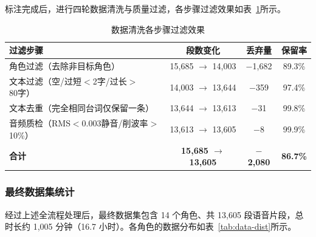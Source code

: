\documentclass[12pt,a4paper]{article}
\begin{document}
标注完成后，进行四轮数据清洗与质量过滤，各步骤过滤效果如表~\ref{tab:data-clean}所示。

\begin{table}[H]
\centering
\caption{数据清洗各步骤过滤效果}
\label{tab:data-clean}
\begin{tabular}{lccc}
\toprule
\textbf{过滤步骤} & \textbf{段数变化} & \textbf{丢弃量} & \textbf{保留率} \\
\midrule
角色过滤（去除非目标角色）         & 15,685 $\to$ 14,003 & $-$1,682 & 89.3\% \\
文本过滤（空/过短$<$2字/过长$>$80字） & 14,003 $\to$ 13,644 & $-$359  & 97.4\% \\
文本去重（完全相同台词仅保留一条）     & 13,644 $\to$ 13,613 & $-$31   & 99.8\% \\
音频质检（RMS$<$0.003静音/削波率$>$10\%） & 13,613 $\to$ 13,605 & $-$8    & 99.9\% \\
\midrule
\rowcolor{Amid!20}
\textbf{合计} & \textbf{15,685 $\to$ 13,605} & \textbf{$-$2,080} & \textbf{86.7\%} \\
\bottomrule
\end{tabular}
\end{table}

\subsubsection{最终数据集统计}

经过上述全流程处理后，最终数据集包含 14 个角色、共 13,605 段语音片段，总时长约 1,005 分钟（16.7 小时）。各角色的数据分布如表~\ref{tab:data-dist}所示。
\end{document}
